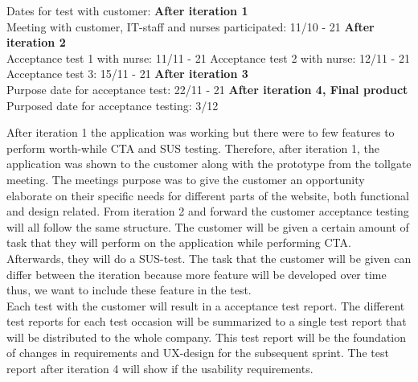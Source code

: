 \noindent Dates for test with customer:\newline
\textbf{After iteration 1}\\
Meeting with customer, IT-staff and nurses participated: 11/10 - 21\newline
\textbf{After iteration 2}\\
Acceptance test 1 with nurse: 11/11 - 21\newline
Acceptance test 2 with nurse: 12/11 - 21\newline
Acceptance test 3: 15/11 - 21\newline
\textbf{After iteration 3}\\
Purpose date for acceptance test: 22/11 - 21\newline
\textbf{After iteration 4, Final product}\\
Purposed date for acceptance testing: 3/12\newline

\noindent After iteration 1 the application was working but there were to few features to perform worth-while CTA and SUS testing. Therefore, after iteration 1, the application was shown to the customer along with the prototype from the tollgate meeting. The meetings purpose was to give the customer an opportunity elaborate on their specific needs for different parts of the website, both functional and design related. From iteration 2 and forward the customer acceptance testing will all follow the same structure. The customer will be given a certain amount of task that they will perform on the application while performing CTA. Afterwards, they will do a SUS-test. The task that the customer will be given can differ between the iteration because more feature will be developed over time thus, we want to include these feature in the test. \\

\noindent Each test with the customer will result in a acceptance test report. The different test reports for each test occasion will be summarized to a single test report that will be distributed to the whole company. This test report will be the foundation of changes in requirements and UX-design for the subsequent sprint. The test report after iteration 4 will show if the usability requirements.

\begin{comment}
\noindent (Between the tests with the customer, user tests will also be performed on other test objects than the customer. This test will test the progress of the different cross-functional teams and will be done by each tester in that cross-functional team.) Not sure we will use this
\end{comment}

